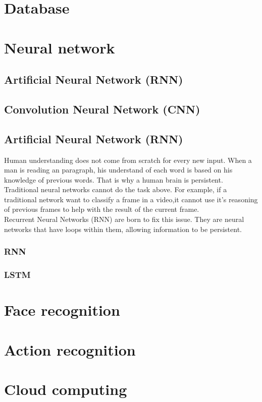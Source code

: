 \section{Database}
\section{Neural network}
\subsection{Artificial Neural Network (RNN)}
\subsection{Convolution Neural Network (CNN)}

\subsection{Artificial Neural Network (RNN)}
Human understanding does not come from scratch for every new input. When a man is reading an paragraph, his understand of each word is based on his knowledge of previous words. That is why a human brain is persistent.\\
Traditional neural networks cannot do the task above. For example, if a traditional network want to classify a frame in a video,it cannot use it's reasoning of previous frames to help with the result of the current frame. \\
Recurrent Neural Networks (RNN) are born to fix this issue. They are neural networks that have loops within them, allowing information to be persistent. 
\subsubsection{RNN}
\subsubsection{LSTM}


\section{Face recognition}
\section{Action recognition}
\section{Cloud computing}
